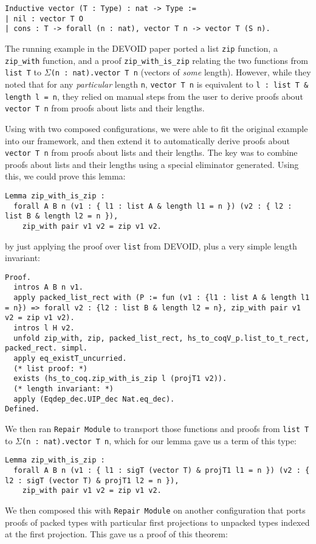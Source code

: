 \begin{lstlisting}
Inductive vector (T : Type) : nat -> Type :=
| nil : vector T O
| cons : T -> forall (n : nat), vector T n -> vector T (S n).
\end{lstlisting}

The running example in the DEVOID paper ported a list \lstinline{zip} function,
a \lstinline{zip_with} function, and a proof \lstinline{zip_with_is_zip} relating the two
functions from \lstinline{list T} to $\Sigma$\lstinline{(n : nat).vector T n} (vectors of
\textit{some} length).
However, while they noted that for any \textit{particular} length \lstinline{n}, \lstinline{vector T n} is equivalent to
\lstinline{l : list T & length l = n}, they relied on manual steps from the user to derive proofs about \lstinline{vector T n}
from proofs about lists and their lengths.

Using \toolname with two composed configurations, we were able to fit the original example into our framework,
and then extend it to automatically derive proofs about \lstinline{vector T n} from proofs about lists and their lengths.
The key was to combine proofs about lists and their lengths using a special eliminator \toolname generated.
Using this, we could prove this lemma:

\begin{lstlisting}
Lemma zip_with_is_zip :
  forall A B n (v1 : { l1 : list A & length l1 = n }) (v2 : { l2 : list B & length l2 = n }),
    zip_with pair v1 v2 = zip v1 v2.
\end{lstlisting}
by just applying the proof over \lstinline{list} from DEVOID, plus a very simple length invariant:

\begin{lstlisting}
Proof.
  intros A B n v1. 
  apply packed_list_rect with (P := fun (v1 : {l1 : list A & length l1 = n}) => forall v2 : {l2 : list B & length l2 = n}, zip_with pair v1 v2 = zip v1 v2).
  intros l H v2.
  unfold zip_with, zip, packed_list_rect, hs_to_coqV_p.list_to_t_rect, packed_rect. simpl.
  apply eq_existT_uncurried.
  (* list proof: *)
  exists (hs_to_coq.zip_with_is_zip l (projT1 v2)).
  (* length invariant: *)
  apply (Eqdep_dec.UIP_dec Nat.eq_dec).
Defined.
\end{lstlisting}
We then ran \lstinline{Repair Module} to transport those functions and proofs from \lstinline{list T}
to $\Sigma$\lstinline{(n : nat).vector T n}, which for our lemma gave us a term of this type:

\begin{lstlisting}
Lemma zip_with_is_zip :
  forall A B n (v1 : { l1 : sigT (vector T) & projT1 l1 = n }) (v2 : { l2 : sigT (vector T) & projT1 l2 = n }),
    zip_with pair v1 v2 = zip v1 v2.
\end{lstlisting}
We then composed this with \lstinline{Repair Module} on another configuration that ports proofs of
packed types with particular first projections to unpacked types indexed at the first projection.
This gave us a proof of this theorem:


